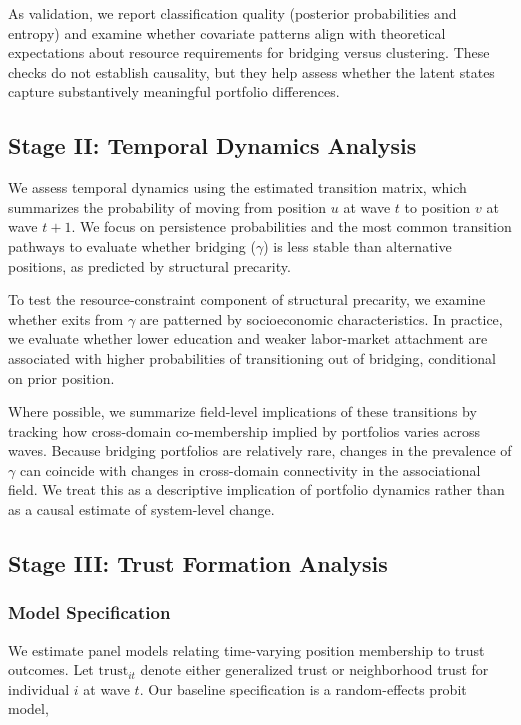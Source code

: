 As validation, we report classification quality (posterior probabilities and entropy) and examine whether covariate patterns align with theoretical expectations about resource requirements for bridging versus clustering. These checks do not establish causality, but they help assess whether the latent states capture substantively meaningful portfolio differences.


\subsection{Stage II: Temporal Dynamics Analysis}

We assess temporal dynamics using the estimated transition matrix, which summarizes the probability of moving from position $u$ at wave $t$ to position $v$ at wave $t+1$. We focus on persistence probabilities and the most common transition pathways to evaluate whether bridging ($\gamma$) is less stable than alternative positions, as predicted by structural precarity.

To test the resource-constraint component of structural precarity, we examine whether exits from $\gamma$ are patterned by socioeconomic characteristics. In practice, we evaluate whether lower education and weaker labor-market attachment are associated with higher probabilities of transitioning out of bridging, conditional on prior position.

Where possible, we summarize field-level implications of these transitions by tracking how cross-domain co-membership implied by portfolios varies across waves. Because bridging portfolios are relatively rare, changes in the prevalence of $\gamma$ can coincide with changes in cross-domain connectivity in the associational field. We treat this as a descriptive implication of portfolio dynamics rather than as a causal estimate of system-level change.

\subsection{Stage III: Trust Formation Analysis}

\subsubsection{Model Specification}

We estimate panel models relating time-varying position membership to trust outcomes. Let $\text{trust}_{it}$ denote either generalized trust or neighborhood trust for individual $i$ at wave $t$. Our baseline specification is a random-effects probit model,

